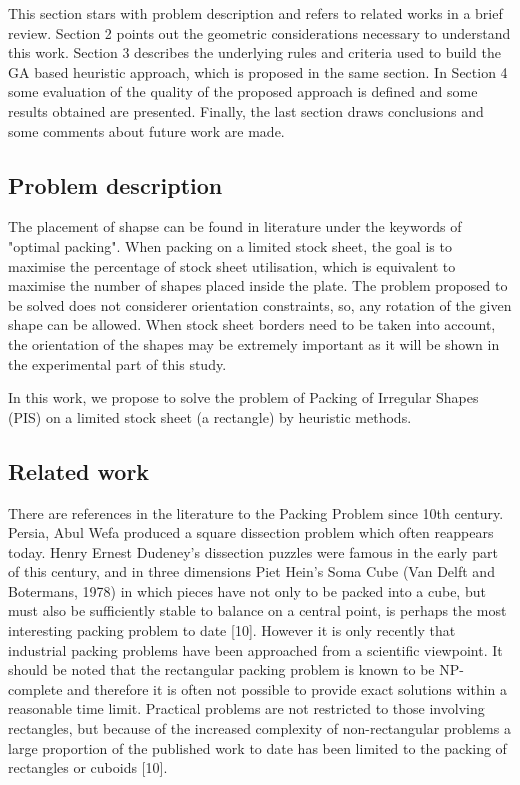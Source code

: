 \documentclass{llncs}
\begin{document}
This section stars with problem description and refers to related works in a brief review. Section 2 points out the geometric considerations necessary to understand this work. Section 3 describes the underlying rules and criteria used to build the GA based heuristic approach, which is proposed in the same section. In Section 4 some evaluation of the quality of the proposed approach is defined and some results obtained are presented. Finally, the last section draws conclusions and some comments about future work are made.
%
\subsection{Problem description}
%
The placement of shapse can be found in literature under the keywords of "optimal packing". When packing on a limited stock sheet, the
goal is to maximise the percentage of stock sheet utilisation, which is equivalent to maximise the number of shapes placed inside the plate. The problem proposed to be solved does not considerer orientation constraints, so, any rotation of the given shape can be allowed. When stock sheet borders need to be taken into account, the orientation of the shapes may be extremely important as it will be shown in the experimental part of this study.

In this work, we propose to solve the problem of Packing of Irregular Shapes (PIS) on a limited stock sheet (a rectangle) by heuristic methods.
%
\subsection{Related work}
%
There are references in the literature to the Packing Problem since 10th century. Persia, Abul Wefa produced a square dissection problem which often reappears today. Henry Ernest Dudeney's dissection puzzles were famous in the early part of this century, and in three dimensions Piet Hein's Soma Cube (Van Delft and Botermans, 1978) in which pieces have not only to be packed into a cube, but must also be sufficiently stable to balance on a central point, is perhaps the most interesting packing problem to date [10]. However it is only recently that industrial packing problems have been approached from a scientific viewpoint. It should be noted that the rectangular packing problem is known to be NP-complete and therefore it is often not possible to provide exact solutions within a reasonable time limit. Practical problems are not restricted to those involving rectangles, but because of the increased complexity of non-rectangular problems a large proportion of the published work to date has been limited to the packing of rectangles or cuboids [10]. 
%
\end{document}
